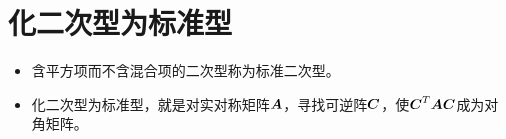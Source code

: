\section{化二次型为标准型}

\begin{frame}
  
    \begin{itemize}
    \item 含平方项而不含混合项的二次型称为标准二次型。\\[0.2cm]
    \item 化二次型为标准型，就是对实对称矩阵$\boldsymbol{A}$，寻找可逆阵$\boldsymbol{C}$，使$\boldsymbol{C}^T\boldsymbol{A}\boldsymbol{C}$成为对角矩阵。
    \end{itemize}
  
\end{frame}





